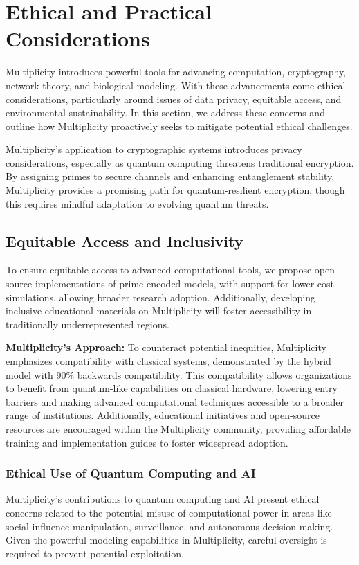 \documentclass{article}
\theoremstyle{plain}
\begin{document}
\section{Ethical and Practical Considerations}

Multiplicity introduces powerful tools for advancing computation, cryptography, network theory, and biological modeling. With these advancements come ethical considerations, particularly around issues of data privacy, equitable access, and environmental sustainability. In this section, we address these concerns and outline how Multiplicity proactively seeks to mitigate potential ethical challenges.

Multiplicity’s application to cryptographic systems introduces privacy considerations, especially as quantum computing threatens traditional encryption. By assigning primes to secure channels and enhancing entanglement stability, Multiplicity provides a promising path for quantum-resilient encryption, though this requires mindful adaptation to evolving quantum threats.

\subsection{Equitable Access and Inclusivity}
To ensure equitable access to advanced computational tools, we propose open-source implementations of prime-encoded models, with support for lower-cost simulations, allowing broader research adoption. Additionally, developing inclusive educational materials on Multiplicity will foster accessibility in traditionally underrepresented regions.


\textbf{Multiplicity’s Approach:} To counteract potential inequities, Multiplicity emphasizes compatibility with classical systems, demonstrated by the hybrid model with 90\% backwards compatibility. This compatibility allows organizations to benefit from quantum-like capabilities on classical hardware, lowering entry barriers and making advanced computational techniques accessible to a broader range of institutions. Additionally, educational initiatives and open-source resources are encouraged within the Multiplicity community, providing affordable training and implementation guides to foster widespread adoption.

\subsubsection{Ethical Use of Quantum Computing and AI}
Multiplicity’s contributions to quantum computing and AI present ethical concerns related to the potential misuse of computational power in areas like social influence manipulation, surveillance, and autonomous decision-making. Given the powerful modeling capabilities in Multiplicity, careful oversight is required to prevent potential exploitation.
\end{document}
